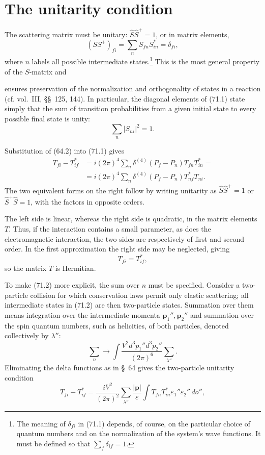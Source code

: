 \section{The unitarity condition}

The scattering matrix must be unitary: $\hat S\hat S^+=1$, or in matrix elements,
\begin{equation}
(SS^+)_{fi}=\sum_n S_{fn}S_{in}^*=\delta_{fi},
\tag{71.1}
\end{equation}
where $n$ labels all possible intermediate states.\footnote{The meaning of $\delta_{fi}$ in (71.1) depends, of course, on the particular choice of quantum numbers and on the normalization of the system's wave functions. It must be defined so that $\sum_f\delta_{if}=1$.} This is the most general property of the $S$-matrix and

ensures preservation of the normalization and orthogonality of states in a reaction (cf. vol.~III, \S\S~125, 144). In particular, the diagonal elements of (71.1) state simply that the sum of transition probabilities from a given initial state to every possible final state is unity:
\[
\sum_n\lvert S_{ni}\rvert^2=1.
\]

Substitution of (64.2) into (71.1) gives
\begin{equation}
\begin{aligned}
T_{fi}-T_{if}^*&=i(2\pi)^4\sum_n\delta^{(4)}(P_f-P_n)T_{fn}T_{in}^*={}\\
&=i(2\pi)^4\sum_n\delta^{(4)}(P_f-P_n)T_{nf}^*T_{ni}.
\end{aligned}
\tag{71.2}
\end{equation}
The two equivalent forms on the right follow by writing unitarity as $\hat S\hat S^+=1$ or $\hat S^+\hat S=1$, with the factors in opposite orders.

The left side is linear, whereas the right side is quadratic, in the matrix elements $T$. Thus, if the interaction contains a small parameter, as does the electromagnetic interaction, the two sides are respectively of first and second order. In the first approximation the right side may be neglected, giving
\begin{equation}
T_{fi}=T_{if}^*,
\tag{71.3}
\end{equation}
so the matrix $T$ is Hermitian.

To make (71.2) more explicit, the sum over $n$ must be specified. Consider a two-particle collision for which conservation laws permit only elastic scattering; all intermediate states in (71.2) are then two-particle states. Summation over them means integration over the intermediate momenta $\mathbf p_1'',\mathbf p_2''$ and summation over the spin quantum numbers, such as helicities, of both particles, denoted collectively by $\lambda''$:
\[
\sum_n\longrightarrow\int\frac{V^2d^3p_1''d^3p_2''}{(2\pi)^6}\sum_{\lambda''}.
\]
Eliminating the delta functions as in \S~64 gives the two-particle unitarity condition
\[
T_{fi}-T_{if}^*=\frac{iV^2}{(2\pi)^2}\sum_{\lambda''}\frac{\lvert\mathbf p\rvert}{\varepsilon}
\int T_{fn}T_{in}^*\varepsilon_1''\varepsilon_2''\,do'',
\]

